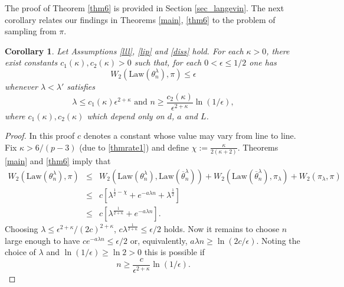 \documentclass[a4paper]{article}
\newtheorem{corollary}[theorem]{Corollary}
\begin{document}
The proof of Theorem \ref{thm6} is provided in Section \ref{sec_langevin}. The next corollary relates our findings in Theorems \ref{main}, \ref{thm6} to the problem of sampling from $\pi$.

\begin{corollary}\label{dros}
Let Assumptions \ref{lll}, \ref{lip} and \ref{diss} hold.  For each $\kappa>0$, there exist constants $c_1(\kappa),c_2(\kappa)>0$ such that, for each
	$0<\epsilon\leq 1/2$ one has
	$$
	W_2(\mathrm{Law}(\theta^{\lambda}_n),\pi)\leq \epsilon
	$$
	whenever \color{red} $\lambda <\lambda'$ satisfies \color{black}
	\begin{equation}\label{sharp}
	\lambda\leq  c_1(\kappa)\epsilon^{2+\kappa}\mbox{ and }n\geq
	\frac{c_2(\kappa)}{\epsilon^{2+\kappa}}\ln(1/\epsilon),
	\end{equation}
where $c_1(\kappa), c_2(\kappa)$ which depend only on $d$, $a$ and $L$.
\end{corollary}
\begin{proof} In this proof $c$ denotes a constant whose value may vary from line
to line. Fix \color{red} $\kappa>6/(p-3)$ (due to \eqref{thmrate1}) \color{black} and define $\chi:=\frac{\kappa}{2(\kappa+2)}$.
Theorems \ref{main} and \ref{thm6} imply that
\begin{eqnarray*}
W_2(\mathrm{Law}(\theta^{\lambda}_n),\pi)&\leq&
W_2(\mathrm{Law}(\theta^{\lambda}_n),\mathrm{Law}(\overline{\theta}^{\lambda}_n))+
W_2(\mathrm{Law}(\overline{\theta}^{\lambda}_n),\pi_{\lambda})+
W_2(\pi_{\lambda},\pi) \\
&\leq& c[\lambda^{\frac{1}{2}-\chi}+e^{-a\lambda n}+\lambda^{\frac{1}{2}}] \\
&\leq& c[\lambda^{\frac{1}{2+\kappa}}+e^{-a\lambda n}].
\end{eqnarray*}
Choosing $\lambda\leq \epsilon^{2+\kappa}/(2c)^{2+\kappa}$,
$c\lambda^{\frac{1}{2+\kappa}}\leq\epsilon/2$ holds. Now it remains
to choose $n$ large enough to have $ce^{-a\lambda n}\leq \epsilon/2$ or,
equivalently, $a\lambda n\geq \ln(2c/\epsilon)$. Noting the choice of $\lambda$
and $\ln(1/\epsilon)\geq \ln 2>0$ this is possible if
$$
n\geq\frac{c}{\epsilon^{2+\kappa}}\ln(1/\epsilon).
$$
\end{proof}
\end{document}
